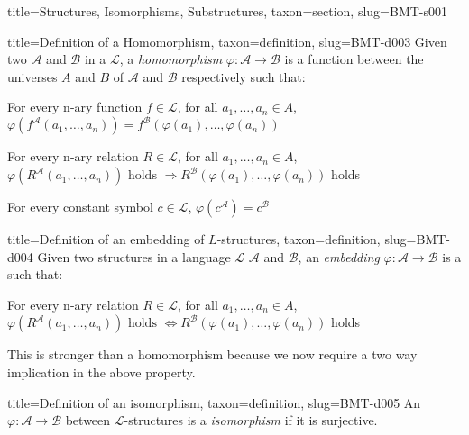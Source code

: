 \documentclass[a4paper]{article}
\begin{document}
\begin{tree}{title={Structures, Isomorphisms, Substructures}, taxon={section}, slug={BMT-s001}}
\begin{tree}{title={Definition of a Homomorphism}, taxon={definition}, slug={BMT-d003}}
Given two  \(\mathcal {A}\) and \(\mathcal {B}\) in a  \(\mathcal {L}\), a \emph{homomorphism} \(\varphi :  \mathcal {A}  \rightarrow   \mathcal {B}\)
is a function between the universes \(A\) and \(B\) of \(\mathcal {A}\) and \(\mathcal {B}\) respectively such that:\par{ For every n-ary function \(f \in   \mathcal {L}\), for all \(a_1, \dots , a_n \in  A\), \(\varphi (f^{ \mathcal {A}}(a_1, \dots , a_n)) = f^{ \mathcal {B}}( \varphi (a_1), \dots ,  \varphi (a_n))\)}\par{For every n-ary relation \(R \in   \mathcal {L}\), for all \(a_1, \dots , a_n  \in  A\), \(\varphi (R^{ \mathcal {A}}(a_1, \dots , a_n))  \text { holds }  \Rightarrow  R^{ \mathcal {B}}( \varphi (a_1),  \dots ,  \varphi (a_n))\) holds}\par{For every constant symbol \(c  \in   \mathcal {L}\), \(\varphi (c^{ \mathcal {A}}) =c^{ \mathcal {B}}\)}
\end{tree}

\begin{tree}{title={Definition of an embedding of \(L\)-structures}, taxon={definition}, slug={BMT-d004}}
Given two structures in a language \(\mathcal {L}\) \(\mathcal {A}\) and \(\mathcal {B}\), an \emph{embedding} \(\varphi :  \mathcal {A}  \rightarrow   \mathcal {B}\)
is a  such that:\par{For every n-ary relation \(R \in   \mathcal {L}\), for all \(a_1, \dots , a_n  \in  A\), \(\varphi (R^{ \mathcal {A}}(a_1, \dots , a_n))  \text { holds }  \Leftrightarrow  R^{ \mathcal {B}}( \varphi (a_1),  \dots ,  \varphi (a_n))\) holds}\par{This is stronger than a homomorphism because we now require a two way implication in the above property.}
\end{tree}

\begin{tree}{title={Definition of an isomorphism}, taxon={definition}, slug={BMT-d005}}
An  \(\varphi :  \mathcal {A}  \rightarrow   \mathcal {B}\) between \(\mathcal {L}\)-structures is a \emph{isomorphism} if it is surjective.
\end{tree}


\end{tree}
\end{document}
